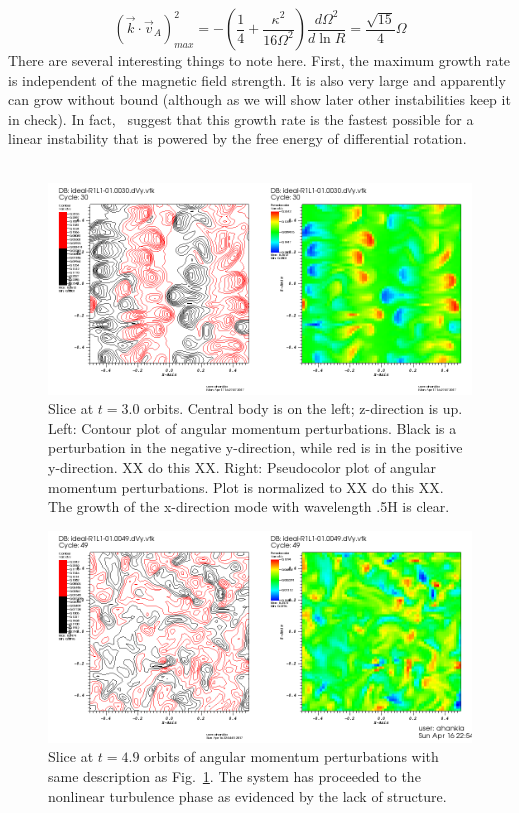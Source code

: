 \begin{equation}
  (\vec k\cdot\vec v_A)^2_{max}=-\left(\frac14+\frac{\kappa^2}{16\Omega^2}\right)\frac{d\Omega^2}{d\ln R}=\frac{\sqrt{15}}{4}\Omega \label{eq:idealmaxk}
\end{equation}
There are several interesting things to note here. First, the maximum growth rate is independent of the magnetic field strength. It is also very large and apparently can grow without bound (although as we will show later other instabilities keep it in check). In fact,~\citet{Balbus1992} suggest that this growth rate is the fastest possible for a linear instability that is powered by the free energy of differential rotation. \\
\\
\begin{figure}
  \begin{center}  
    \includegraphics[width=\textwidth, angle=0.]{img/ideal-R1L1-dVy-xz-t30-contpseudo.png}
  \end{center}
  \caption{Slice at $t=3.0$ orbits. Central body is on the left; z-direction is up. Left: Contour plot of angular momentum perturbations. Black is a perturbation in the negative y-direction, while red is in the positive y-direction. XX do this XX. Right: Pseudocolor plot of angular momentum perturbations. Plot is normalized to XX do this XX. The growth of the x-direction mode with wavelength .5H is clear.}
  \label{fig:idealgrowth}
\end{figure}
\begin{figure}
  \begin{center}  
    \includegraphics [width=\textwidth, angle=0.]{img/ideal-R1L1-01-dVy-xz-t49.png}
  \end{center}
  \caption{Slice at $t=4.9$ orbits of angular momentum perturbations with same description as Fig.~\ref{fig:idealgrowth}. The system has proceeded to the nonlinear turbulence phase as evidenced by the lack of structure.}
  \label{fig:idealturb}
\end{figure}
